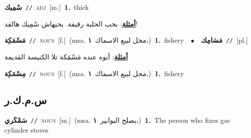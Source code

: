 \documentclass[10pt,a4paper,twoside]{article} %
\begin{document}
\begin{multicols}{2}
{\setlength\topsep{0pt}\textbf{\foreignlanguage{arabic}{سْمِيك}}\ {\color{gray}\texttt{//}\color{black}}\ \textsc{adj}\ [m.]\ \textbf{1.}~thick\  \begin{flushright}\color{gray}\foreignlanguage{arabic}{\textbf{\underline{\foreignlanguage{arabic}{أمثلة}}}: بحب الحلبة رقيقة. بحبهاش سْمِيك هالقد!}\end{flushright}\color{black}} \vspace{2mm}

{\setlength\topsep{0pt}\textbf{\foreignlanguage{arabic}{مَسْمَكِة}}\ {\color{gray}\texttt{//}\color{black}}\ \textsc{noun}\ [f.]\ \color{gray}(msa. \foreignlanguage{arabic}{محل لبيع الاسماك}~\foreignlanguage{arabic}{\textbf{١.}})\color{black}\ \textbf{1.}~fishery\ \ $\bullet$\ \ \setlength\topsep{0pt}\textbf{\foreignlanguage{arabic}{مَسَامِك}}\ {\color{gray}\texttt{//}\color{black}}\ [pl.]\  \begin{flushright}\color{gray}\foreignlanguage{arabic}{\textbf{\underline{\foreignlanguage{arabic}{أمثلة}}}: أبوه عنده مَسْمَكة  تلا الكنيسة القديمة}\end{flushright}\color{black}} \vspace{2mm}

{\setlength\topsep{0pt}\textbf{\foreignlanguage{arabic}{مِسْمَكِة}}\ {\color{gray}\texttt{//}\color{black}}\ \textsc{noun}\ [f.]\ \color{gray}(msa. \foreignlanguage{arabic}{محل لبيع الاسماك}~\foreignlanguage{arabic}{\textbf{١.}})\color{black}\ \textbf{1.}~fishery\ } \vspace{2mm}

\vspace{-3mm}
\subsection*{\color{blue}\foreignlanguage{arabic}{س.م.ك.ر}\color{blue}{}} 

{\setlength\topsep{0pt}\textbf{\foreignlanguage{arabic}{سَمْكَري}}\ {\color{gray}\texttt{//}\color{black}}\ \textsc{noun}\ [m.]\ \color{gray}(msa. \foreignlanguage{arabic}{يصلح البوابير}~\foreignlanguage{arabic}{\textbf{١.}})\color{black}\ \textbf{1.}~The person who fixes gas cylinder stoves\ } \vspace{2mm}


\end{multicols}
\end{document}
